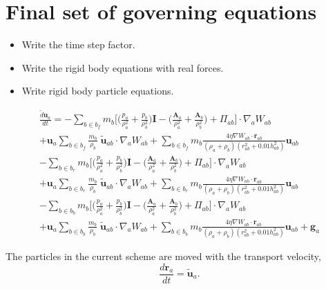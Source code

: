 \documentclass[preprint,12pt]{elsarticle}
\newcommand{\ten}[1]{\ensuremath{\mathbf{#1}}}
\begin{document}
\FloatBarrier%
\section{Final set of governing equations}
\label{sec:final_discretized_equations}


\begin{itemize}
\item Write the time step factor.
\item Write the rigid body equations with real forces.
\item Write rigid body particle equations.
\end{itemize}

\begin{multline}
  \label{eq:sph-momentum-fluid}
  \frac{\tilde{d}\ten{u}_{a}}{dt} = - \sum_{b \in b_f} m_b \bigg[
  \bigg(\frac{p_a}{\rho_a^2} + \frac{p_b}{\rho_b^2}\bigg) \ten{I} -
  \bigg(\frac{\ten{A}_a}{\rho_a^2} + \frac{\ten{A}_b}{\rho_b^2}
  \bigg) + \Pi_{ab} \bigg]
  \cdot \nabla_{a} W_{ab} \\
  + \ten{u}_{a} \sum_{b \in b_f} \frac{m_b}{\rho_{b}} \; \tilde{\ten{u}}_{ab} \cdot
  \nabla_{a} W_{ab} + \sum_{b \in b_f} m_b \frac{4 \eta \nabla W_{ab}\cdot
    \ten{r}_{ab}}{(\rho_a + \rho_b) (r_{ab}^2 + 0.01 h_{ab}^2)} \ten{u}_{ab} \\
 - \sum_{b \in b_r} m_b \bigg[
  \bigg(\frac{p_a}{\rho_a^2} + \frac{p_b}{\rho_b^2}\bigg) \ten{I} -
  \bigg(\frac{\ten{A}_a}{\rho_a^2} + \frac{\ten{A}_b}{\rho_b^2}
  \bigg) + \Pi_{ab} \bigg]
  \cdot \nabla_{a} W_{ab} \\
  + \ten{u}_{a} \sum_{b \in b_r} \frac{m_b}{\rho_{b}} \; \tilde{\ten{u}}_{ab} \cdot
  \nabla_{a} W_{ab} + \sum_{b \in b_r} m_b \frac{4 \eta \nabla W_{ab}\cdot
    \ten{r}_{ab}}{(\rho_a + \rho_b) (r_{ab}^2 + 0.01 h_{ab}^2)} \ten{u}_{ab}\\
 - \sum_{b \in b_b} m_b \bigg[
  \bigg(\frac{p_a}{\rho_a^2} + \frac{p_b}{\rho_b^2}\bigg) \ten{I} -
  \bigg(\frac{\ten{A}_a}{\rho_a^2} + \frac{\ten{A}_b}{\rho_b^2}
  \bigg) + \Pi_{ab} \bigg]
  \cdot \nabla_{a} W_{ab} \\
  + \ten{u}_{a} \sum_{b \in b_b} \frac{m_b}{\rho_{b}} \; \tilde{\ten{u}}_{ab} \cdot
  \nabla_{a} W_{ab} + \sum_{b \in b_b} m_b \frac{4 \eta \nabla W_{ab}\cdot
    \ten{r}_{ab}}{(\rho_a + \rho_b) (r_{ab}^2 + 0.01 h_{ab}^2)} \ten{u}_{ab}
  + \ten{g}_{a}
\end{multline}


The particles in the current scheme are moved with the transport velocity,
\begin{equation}
  \label{eq:transport_velocity_position_derivative}
  \frac{d\ten{r}_a}{dt} = \ten{\tilde{u}}_a.
\end{equation}
\end{document}
